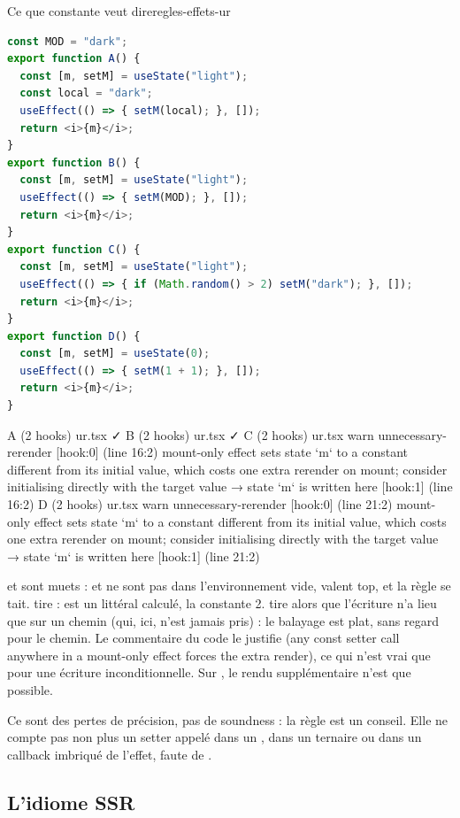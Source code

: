 \begin{exemple}{Ce que \og constante\fg{} veut dire}{regles-effets-ur}
\begin{lstlisting}[language=TypeScript]
const MOD = "dark";
export function A() {
  const [m, setM] = useState("light");
  const local = "dark";
  useEffect(() => { setM(local); }, []);
  return <i>{m}</i>;
}
export function B() {
  const [m, setM] = useState("light");
  useEffect(() => { setM(MOD); }, []);
  return <i>{m}</i>;
}
export function C() {
  const [m, setM] = useState("light");
  useEffect(() => { if (Math.random() > 2) setM("dark"); }, []);
  return <i>{m}</i>;
}
export function D() {
  const [m, setM] = useState(0);
  useEffect(() => { setM(1 + 1); }, []);
  return <i>{m}</i>;
}
\end{lstlisting}
\begin{sortie}
  A  (2 hooks)  ur.tsx  ✓
  B  (2 hooks)  ur.tsx  ✓
  C  (2 hooks)  ur.tsx
    warn   unnecessary-rerender  [hook:0]  (line 16:2)  mount-only effect sets state `m` to a constant different from its initial value, which costs one extra rerender on mount; consider initialising directly with the target value
       → state `m` is written here [hook:1] (line 16:2)
  D  (2 hooks)  ur.tsx
    warn   unnecessary-rerender  [hook:0]  (line 21:2)  mount-only effect sets state `m` to a constant different from its initial value, which costs one extra rerender on mount; consider initialising directly with the target value
       → state `m` is written here [hook:1] (line 21:2)
\end{sortie}
 et  sont muets :  et  ne sont pas dans l'environnement vide, valent top, et la règle se tait.  tire :  est un littéral calculé, la constante 2.  tire alors que l'écriture n'a lieu que sur un chemin (qui, ici, n'est jamais pris) : le balayage est plat, sans regard pour le chemin. Le commentaire du code le justifie (\og any const setter call anywhere in a mount-only effect forces the extra render\fg{}), ce qui n'est vrai que pour une écriture inconditionnelle. Sur , le rendu supplémentaire n'est que possible.
\end{exemple}

Ce sont des pertes de précision, pas de soundness : la règle est un conseil. Elle ne compte pas non plus un setter appelé dans un , dans un ternaire ou dans un callback imbriqué de l'effet, faute de .

\subsection{L'idiome SSR}

